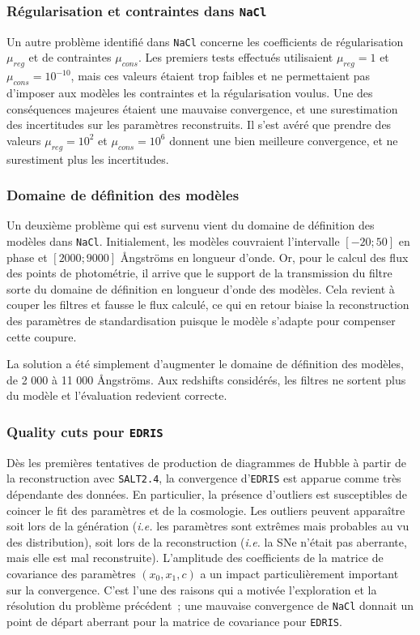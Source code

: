\documentclass{book}
\def\nacl{\texttt{NaCl}\xspace}
\def\edris{\texttt{EDRIS}\xspace}
\def\saltd{\texttt{SALT2.4}\xspace}
\begin{document}
\subsubsection{Régularisation et contraintes dans \nacl}

Un autre problème identifié dans \nacl concerne les coefficients de régularisation $\mu_{reg}$ et de contraintes $\mu_{cons}$. Les premiers tests effectués utilisaient $\mu_{reg} = 1$ et $\mu_{cons} = 10^{-10}$, mais ces valeurs étaient trop faibles et ne permettaient pas d'imposer aux modèles les contraintes et la régularisation voulus. Une des conséquences majeures étaient une mauvaise convergence, et une surestimation des incertitudes sur les paramètres reconstruits.
Il s'est avéré que prendre des valeurs $\mu_{reg} = 10^2$ et $\mu_{cons} = 10^6$ donnent une bien meilleure convergence, et ne surestiment plus les incertitudes.

\subsubsection{Domaine de définition des modèles}

Un deuxième problème qui est survenu vient du domaine de définition des modèles dans \nacl. Initialement, les modèles couvraient l'intervalle $[-20; 50]$ en phase et $[2000; 9000]$ Ångströms en longueur d'onde. Or, pour le calcul des flux des points de photométrie, il arrive que le support de la transmission du filtre sorte du domaine de définition en longueur d'onde des modèles. Cela revient à couper les filtres et fausse le flux calculé, ce qui en retour biaise la reconstruction des paramètres de standardisation puisque le modèle s'adapte pour compenser cette coupure.

La solution a été simplement d'augmenter le domaine de définition des modèles, de 2 000 à 11 000 Ångströms. Aux redshifts considérés, les filtres ne sortent plus du modèle et l'évaluation redevient correcte.

\subsubsection{Quality cuts pour \edris}
\label{sec:qc_edris}
Dès les premières tentatives de production de diagrammes de Hubble à partir de la reconstruction avec \saltd, la convergence d'\edris est apparue comme très dépendante des données. En particulier, la présence d'outliers est susceptibles de coincer le fit des paramètres et de la cosmologie. Les outliers peuvent apparaître soit lors de la génération (\textit{i.e.} les paramètres sont extrêmes mais probables au vu des distribution), soit lors de la reconstruction (\textit{i.e.} la SNe n'était pas aberrante, mais elle est mal reconstruite). L'amplitude des coefficients de la matrice de covariance des paramètres $(x_0, x_1, c)$ a un impact particulièrement important sur la convergence. C'est l'une des raisons qui a motivée l'exploration et la résolution du problème précédent~; une mauvaise convergence de \nacl donnait un point de départ aberrant pour la matrice de covariance pour \edris.
\end{document}
